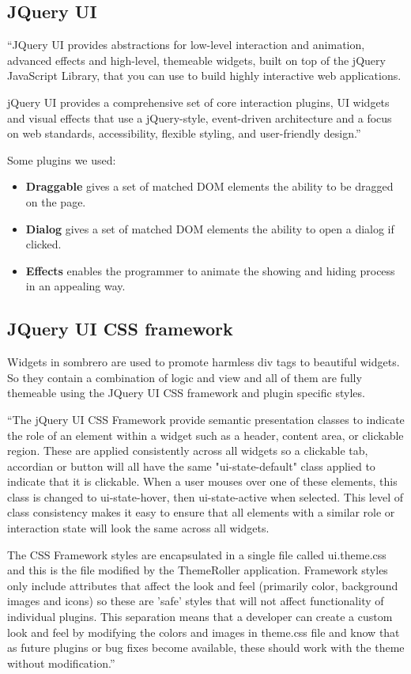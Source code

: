 \subsection{JQuery UI}
``JQuery UI provides abstractions for low-level interaction and animation, advanced effects and high-level, themeable widgets, built on top of the jQuery JavaScript Library, that you can use to build highly interactive web applications.

jQuery UI provides a comprehensive set of core interaction plugins, UI widgets and visual effects that use a jQuery-style, event-driven architecture and a focus on web standards, accessibility, flexible styling, and user-friendly design.''\cite{jqueryui.com}

    Some plugins we used:
    \begin{itemize}
        \item \textbf{Draggable}
            gives a set of matched DOM elements the ability to be dragged on the page.
        \item \textbf{Dialog}
            gives a set of matched DOM elements the ability to open a dialog if clicked.
        \item \textbf{Effects}
            enables the programmer to animate the showing and hiding process in an appealing way.
    \end{itemize}

\subsection{JQuery UI CSS framework}
Widgets in sombrero are used to promote harmless div tags to beautiful widgets. So they contain a combination of logic and view and all of them are fully themeable using the JQuery UI CSS framework and plugin specific styles.

``The jQuery UI CSS Framework provide semantic presentation classes to indicate the role of an element within a widget such as a header, content area, or clickable region. These are applied consistently across all widgets so a clickable tab, accordian or button will all have the same "ui-state-default" class applied to indicate that it is clickable. When a user mouses over one of these elements, this class is changed to ui-state-hover, then ui-state-active when selected. This level of class consistency makes it easy to ensure that all elements with a similar role or interaction state will look the same across all widgets.

The CSS Framework styles are encapsulated in a single file called ui.theme.css and this is the file modified by the ThemeRoller application. Framework styles only include attributes that affect the look and feel (primarily color, background images and icons) so these are 'safe' styles that will not affect functionality of individual plugins. This separation means that a developer can create a custom look and feel by modifying the colors and images in theme.css file and know that as future plugins or bug fixes become available, these should work with the theme without modification.''\cite{jqueryui.com}

